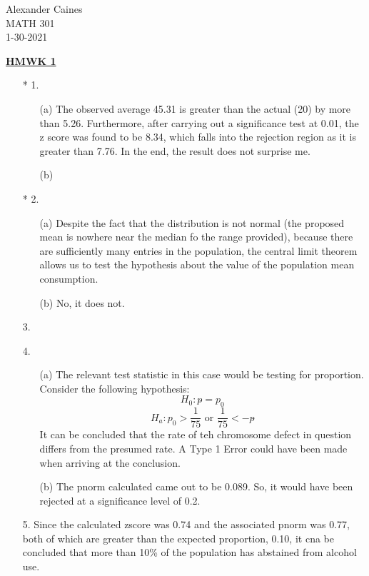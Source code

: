 \documentclass[12pt]{article}
\begin{document}
\vspace{1.0 \baselineskip}

\begin{flushright}
	Alexander Caines\\
	MATH 301\\
	1-30-2021\\
\end{flushright}

\begin{center}
	\textbf{\underline{HMWK 1}}
\end{center}



\begin{enumerate}
	\item[* 1.]
		\begin{enumerate}
			\item[(a)] The observed average 45.31 is greater than the actual (20) by more than 5.26.
				Furthermore, after carrying out a significance test at 0.01, the 
				z score was found to be 8.34, which falls into the rejection region as it 
				is greater than 7.76. In the end, the result does not surprise me.
			\item[(b)]
		\end{enumerate}
	\item[* 2.]
		\begin{enumerate}
			\item[(a)] Despite the fact that the distribution 
				is not normal (the proposed mean is nowhere near the median fo the range provided),
				because there are sufficiently 
				many entries in the population, the central 
				limit theorem allows us to test the hypothesis 
				about the value of the population mean consumption.

			\item[(b)] No, it does not.
		\end{enumerate}
	\item[3.]
	\item[4.]
		\begin{enumerate}
			\item[(a)] The relevant test statistic in this case would be testing for proportion. 
				Consider the following hypothesis: $$H_0: p\hat{}=p_0 $$
				$$H_a: p_0 > \frac{1}{75} \text{ or } \frac{1}{75} < -p\hat{}$$
				It can be concluded that the rate of teh chromosome defect in question 
				differs from the presumed rate. A Type 1 Error could have been made when arriving at the conclusion.

			\item[(b)] The pnorm calculated came out to be 0.089. So, 
				it would have been rejected at a significance level of 0.2.
		\end{enumerate}
	\item[5.] Since the calculated zscore was 0.74 and the associated pnorm was 0.77, both of which are greater than
		the expected proportion, 0.10, it cna be concluded that more than 10\% of the population has abstained from alcohol use.
\end{enumerate}
\end{document}

